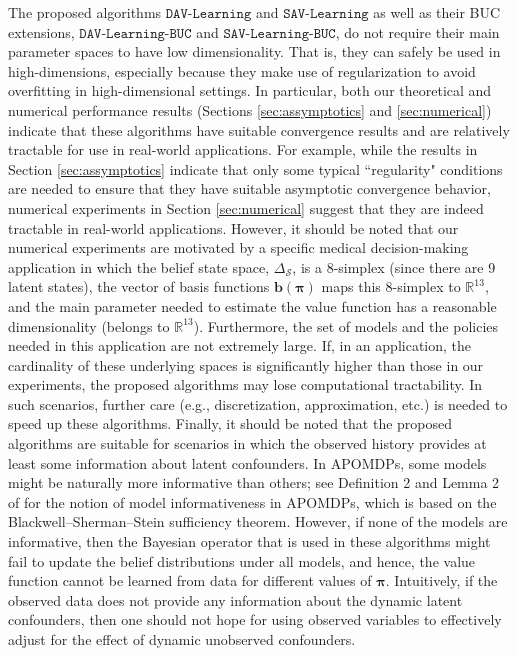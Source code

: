 \documentclass[opre,nonblindrev]{informs2}%
\newcommand{\1}{\hbox{\rm 1\kern-.35em 1}}
\newcommand{\MS}{\mathscr S}
\newcommand{\bpi}{\boldsymbol{\pi}}
\newcommand{\bb}{\mathbf{b}}
\newcommand{\SAV}{\texttt{SAV-Learning}}
\newcommand{\DAV}{\texttt{DAV-Learning}}
\newcommand{\SAVBUC}{\texttt{SAV-Learning-BUC}}
\newcommand{\DAVBUC}{\texttt{DAV-Learning-BUC}}
\begin{document}
\begin{remark}
The proposed algorithms $\DAV$ and $\SAV$ as well as their BUC extensions,   $\DAVBUC$ and $\SAVBUC$,  do not require their main parameter spaces to have low dimensionality. That is,  they can safely be used in high-dimensions, especially because they make use of regularization to avoid overfitting in high-dimensional settings.  In particular, both our theoretical and numerical performance results (Sections \ref{sec:assymptotics} and \ref{sec:numerical}) indicate that these algorithms have suitable convergence results and are relatively tractable for use in real-world applications. For example,  while the results in Section \ref{sec:assymptotics} indicate that only some typical ``regularity" conditions are needed to ensure that they have suitable asymptotic convergence behavior, numerical experiments in Section \ref{sec:numerical}  suggest that they are indeed tractable in real-world applications. However, it should be noted that our numerical experiments are motivated by a specific medical decision-making application in which the belief state space,   $\Delta_\MS$, is a $8$-simplex (since there are 9 latent states), the vector of basis functions $\bb(\bpi)$ maps this  $8$-simplex to $\mathbb R^{13}$, and the main parameter needed to estimate the value function has a reasonable dimensionality (belongs to $\mathbb R^{13}$). Furthermore, the set of models and the  policies needed in this application are not extremely large. If, in an application, the cardinality of these underlying spaces is significantly higher than those in our experiments, the proposed algorithms may lose computational tractability. In such scenarios, further care (e.g., discretization, approximation, etc.) is needed to speed up these algorithms. Finally,  it should be noted that the proposed algorithms are suitable for scenarios in which the observed history provides at least some information about latent confounders. In APOMDPs, some models might be naturally more informative than others; see Definition 2 and Lemma 2 of \cite{Saghafian2018} for the notion of model informativeness in APOMDPs, which is based on the Blackwell–Sherman–Stein sufficiency theorem. However, if none of the models are informative, then the Bayesian operator that is used in these algorithms might fail to update the belief distributions under all models, and hence, the value function cannot be learned from data for different values of $\bpi$. Intuitively, if the observed data does not provide any information about the dynamic latent confounders, then one should not hope for using observed variables to effectively adjust for the effect of dynamic unobserved confounders.
\end{remark}
\end{document}
